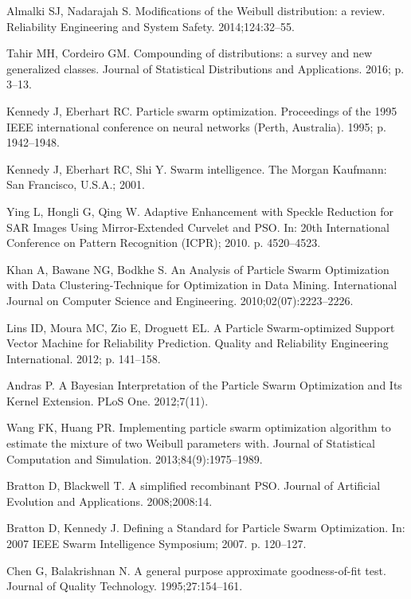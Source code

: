 \documentclass[10pt,letterpaper]{article}
\begin{document}
\begin{thebibliography}{99}
 Almalki SJ, Nadarajah S. Modifications of the Weibull distribution: a review. Reliability Engineering and System Safety. 2014;124:32--55.

 Tahir MH, Cordeiro GM. Compounding of distributions: a survey and new generalized classes. Journal of Statistical Distributions and Applications. 2016; p. 3--13.

 Kennedy J, Eberhart RC. Particle swarm optimization. Proceedings of the 1995 IEEE international conference on neural networks (Perth, Australia). 1995; p. 1942--1948.

 Kennedy J, Eberhart RC, Shi Y. Swarm intelligence. The Morgan Kaufmann: San Francisco, U.S.A.; 2001.

 Ying L, Hongli G, Qing W. Adaptive Enhancement with Speckle Reduction for SAR Images Using Mirror-Extended Curvelet and PSO. In: 20th International Conference on Pattern Recognition (ICPR); 2010. p. 4520--4523.

 Khan A, Bawane NG, Bodkhe S. An Analysis of Particle Swarm Optimization with Data Clustering-Technique for Optimization in Data Mining. International Journal on Computer Science and Engineering. 2010;02(07):2223--2226.

 Lins ID, Moura MC, Zio E, Droguett EL. A Particle Swarm-optimized Support Vector Machine for Reliability Prediction. Quality and Reliability Engineering International. 2012; p. 141--158.

 Andras P. A Bayesian Interpretation of the Particle Swarm Optimization and Its Kernel Extension. PLoS One. 2012;7(11).

 Wang FK, Huang PR. Implementing particle swarm optimization algorithm to estimate the mixture of two Weibull parameters with. Journal of Statistical Computation and Simulation. 2013;84(9):1975--1989.

 Bratton D, Blackwell T. A simplified recombinant PSO. Journal of Artificial Evolution and Applications. 2008;2008:14.

 Bratton D, Kennedy J. Defining a Standard for Particle Swarm Optimization. In: 2007 IEEE Swarm Intelligence Symposium; 2007. p. 120--127.

 Chen G, Balakrishnan N. A general purpose approximate goodness-of-fit test. Journal of Quality Technology. 1995;27:154--161.


\end{thebibliography}
\end{document}

